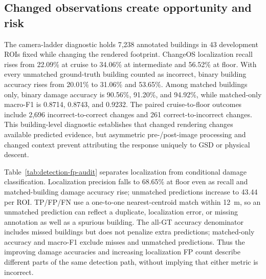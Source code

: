 \subsection{Changed observations create opportunity and risk}
The camera-ladder diagnostic holds 7,238 annotated buildings in 43 development ROIs fixed while changing the rendered footprint. ChangeOS localization recall rises from 22.09\% at cruise to 34.06\% at intermediate and 56.52\% at floor. With every unmatched ground-truth building counted as incorrect, binary building accuracy rises from 20.01\% to 31.06\% and 53.65\%. Among matched buildings only, binary damage accuracy is 90.56\%, 91.20\%, and 94.92\%, while matched-only macro-F1 is 0.8714, 0.8743, and 0.9232. The paired cruise-to-floor outcomes include 2,696 incorrect-to-correct changes and 261 correct-to-incorrect changes. This building-level diagnostic establishes that changed rendering changes available predicted evidence, but asymmetric pre-/post-image processing and changed context prevent attributing the response uniquely to GSD or physical descent.

Table~\ref{tab:detection-fp-audit} separates localization from conditional damage classification. Localization precision falls to 68.65\% at floor even as recall and matched-building damage accuracy rise; unmatched predictions increase to 43.44 per ROI. TP/FP/FN use a one-to-one nearest-centroid match within 12~m, so an unmatched prediction can reflect a duplicate, localization error, or missing annotation as well as a spurious building. The all-GT accuracy denominator includes missed buildings but does not penalize extra predictions; matched-only accuracy and macro-F1 exclude misses and unmatched predictions. Thus the improving damage accuracies and increasing localization FP count describe different parts of the same detection path, without implying that either metric is incorrect.

\begin{table}[!t]
\centering\small
\caption{ChangeOS localization and binary-damage audit on the same 43 development ROIs and 7,238 annotated buildings at each height. Loc. P/R are localization precision/recall; FP is an unmatched prediction, FN an unmatched GT building, and FP/ROI is FP/43. All-GT accuracy counts unmatched GT as wrong but does not count unmatched predictions; matched accuracy and macro-F1 condition on matched GT only.}
\label{tab:detection-fp-audit}
\end{table}


